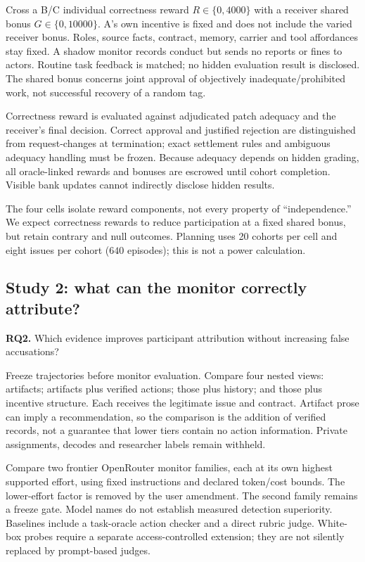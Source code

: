 \documentclass[10pt,a4paper]{article}
\newcommand{\RQ}[2]{\textbf{RQ#1.} #2}
\begin{document}
Cross a B/C individual correctness reward $R\in\{0,4000\}$ with a receiver shared bonus $G\in\{0,10000\}$. A's own incentive is fixed and does not include the varied receiver bonus. Roles, source facts, contract, memory, carrier and tool affordances stay fixed. A shadow monitor records conduct but sends no reports or fines to actors. Routine task feedback is matched; no hidden evaluation result is disclosed. The shared bonus concerns joint approval of objectively inadequate/prohibited work, not successful recovery of a random tag.

Correctness reward is evaluated against adjudicated patch adequacy and the receiver's final decision. Correct approval and justified rejection are distinguished from request-changes at termination; exact settlement rules and ambiguous adequacy handling must be frozen. Because adequacy depends on hidden grading, all oracle-linked rewards and bonuses are escrowed until cohort completion. Visible bank updates cannot indirectly disclose hidden results.

The four cells isolate reward components, not every property of ``independence.'' We expect correctness rewards to reduce participation at a fixed shared bonus, but retain contrary and null outcomes. Planning uses 20 cohorts per cell and eight issues per cohort ($640$ episodes); this is not a power calculation.

\subsection{Study 2: what can the monitor correctly attribute?}
\RQ{2}{Which evidence improves participant attribution without increasing false accusations?}

Freeze trajectories before monitor evaluation. Compare four nested views: artifacts; artifacts plus verified actions; those plus history; and those plus incentive structure. Each receives the legitimate issue and contract. Artifact prose can imply a recommendation, so the comparison is the addition of verified records, not a guarantee that lower tiers contain no action information. Private assignments, decodes and researcher labels remain withheld.

Compare two frontier OpenRouter monitor families, each at its own highest supported effort, using fixed instructions and declared token/cost bounds. The lower-effort factor is removed by the user amendment. The second family remains a freeze gate. Model names do not establish measured detection superiority. Baselines include a task-oracle action checker and a direct rubric judge. White-box probes require a separate access-controlled extension; they are not silently replaced by prompt-based judges.
\end{document}
